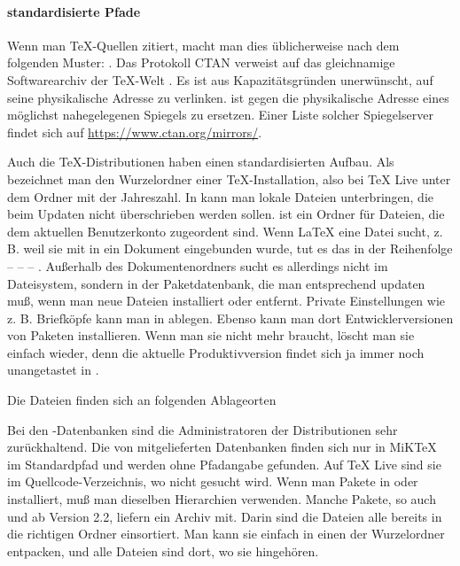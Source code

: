\documentclass[
	11pt,        %
	table,       %
	twoside,     %
	notitlepage, %
]{scrreprt}
\begin{document}
\paragraph{standardisierte Pfade}
Wenn man \TeX-Quellen zitiert, macht man dies üblicherweise nach dem folgenden Muster: . Das Protokoll CTAN verweist auf das gleichnamige Softwarearchiv der \TeX-Welt . Es ist aus Kapazitätsgründen unerwünscht, auf seine physikalische Adresse zu verlinken.  ist gegen die physikalische Adresse eines möglichst nahegelegenen Spiegels zu ersetzen. Einer Liste solcher Spiegelserver findet sich auf \url{https://www.ctan.org/mirrors/}.

Auch die \TeX-Distributionen haben einen standardisierten Aufbau. Als  bezeichnet man den Wurzelordner einer \TeX-Installation, also bei \TeX{} Live unter dem Ordner mit der Jahreszahl. In  kann man lokale Dateien unterbringen, die beim Updaten nicht überschrieben werden sollen.  ist ein Ordner für Dateien, die dem aktuellen Benutzerkonto zugeordent sind. Wenn \LaTeX{} eine Datei sucht, z. B. weil sie mit  in ein Dokument eingebunden wurde, tut es das in der Reihenfolge  –  –  – . Außerhalb des Dokumentenordners sucht es allerdings nicht im Dateisystem, sondern in der Paketdatenbank, die man entsprechend updaten muß, wenn man neue Dateien installiert oder entfernt. Private Einstellungen wie z. B. Briefköpfe kann man in  ablegen. Ebenso kann man dort Entwicklerversionen von Paketen installieren. Wenn man sie nicht mehr braucht, löscht man sie einfach wieder, denn die aktuelle Produktivversion findet sich ja immer noch unangetastet in .

Die Dateien finden sich an folgenden Ablageorten

Bei den \BibTeX-Datenbanken sind die Administratoren der Distributionen sehr zurückhaltend. Die von \archbib{} mitgelieferten Datenbanken finden sich nur in MiK\TeX{} im Standardpfad und werden ohne Pfadangabe gefunden. Auf \TeX{} Live sind sie im Quellcode-Verzeichnis, wo nicht gesucht wird. Wenn man Pakete in  oder  installiert, muß man dieselben Hierarchien verwenden. Manche Pakete, so auch \blx{} und \archbib{} ab Version 2.2, liefern ein Archiv  mit. Darin sind die Dateien alle bereits in die richtigen Ordner einsortiert. Man kann sie einfach in einen der Wurzelordner entpacken, und alle Dateien sind dort, wo sie hingehören.
\end{document}
